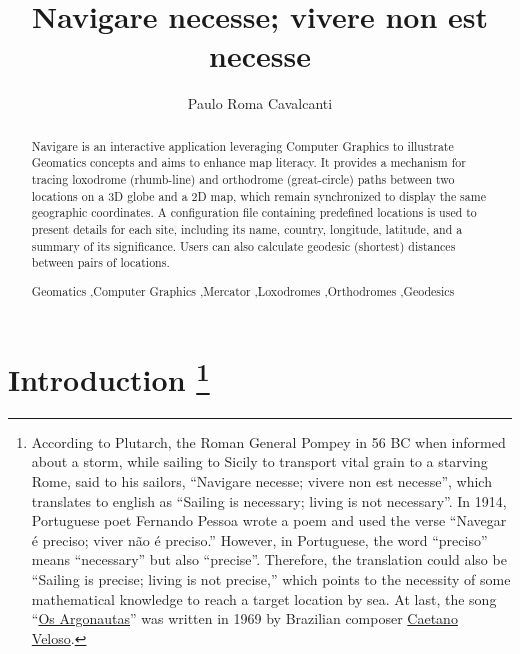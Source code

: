 \documentclass[onecolumn,3p]{elsarticle}
\begin{document}
\begin{frontmatter}
\title{Navigare necesse; vivere non est necesse}

\author[1]{Paulo Roma Cavalcanti}
\address[1]{Department of Computer Science, Universidade Federal do Rio de Janeiro, Brazil}

\begin{abstract}
    Navigare is an interactive application leveraging Computer Graphics to illustrate Geomatics concepts and aims to enhance map literacy.
    It provides a mechanism for tracing loxodrome (rhumb-line) and orthodrome (great-circle) paths between two locations on a 3D globe and a 2D map,
    which remain synchronized to display the same geographic coordinates. A configuration file containing predefined locations is used to present
    details for each site, including its name, country, longitude, latitude, and a summary of its significance.
    Users can also calculate geodesic (shortest) distances between pairs of locations.
\begin{keyword}
    Geomatics \sep Computer Graphics \sep Mercator \sep Loxodromes \sep Orthodromes \sep Geodesics
\end{keyword}
\end{abstract}
\end{frontmatter}

\section{Introduction
\footnote{
According to Plutarch,
the Roman General Pompey in 56 BC when informed about a storm,
while sailing to Sicily to transport vital grain to a starving Rome, said to his sailors,
``Navigare necesse; vivere non est necesse'', which translates to english as ``Sailing is necessary; living is not necessary''.
In 1914, Portuguese poet Fernando Pessoa \cite{pessoa1914navegar} wrote a poem
and used the verse ``Navegar é preciso; viver não é preciso.''
However, in Portuguese, the word ``preciso'' means ``necessary'' but also ``precise''.
Therefore, the translation could also be ``Sailing is precise; living is not precise,''
which points to the necessity of some mathematical
knowledge to reach a target location by sea. At last,
the song ``\href{https://krotalias.github.io/cwdc/13-webgl/extras/images/aod.mp4}{Os Argonautas}''
was written in 1969 by Brazilian composer
\href{https://en.wikipedia.org/wiki/Caetano_Veloso}{Caetano Veloso}.}}
\end{document}
